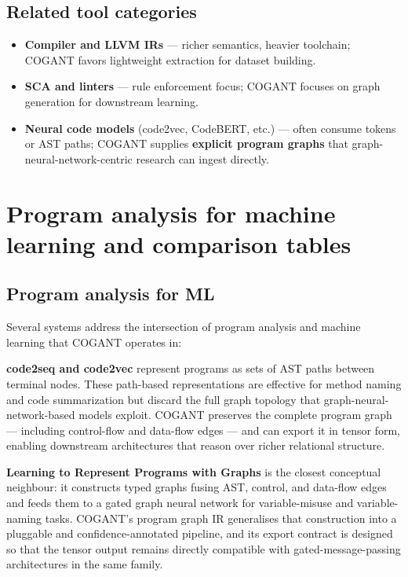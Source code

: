\documentclass[
]{article}
\providecommand{\tightlist}{%
  \setlength{\itemsep}{0pt}\setlength{\parskip}{0pt}}
\begin{document}
\subsection{Related tool categories}\label{related-tool-categories}

\begin{itemize}
\tightlist
\item
  \textbf{Compiler and LLVM IRs} --- richer semantics, heavier
  toolchain; COGANT favors lightweight extraction for dataset building.
\item
  \textbf{SCA and linters} --- rule enforcement focus; COGANT focuses on
  graph generation for downstream learning.
\item
  \textbf{Neural code models} (code2vec, CodeBERT, etc.) --- often
  consume tokens or AST paths; COGANT supplies \textbf{explicit program
  graphs} that graph-neural-network-centric research can ingest
  directly.
\end{itemize}

\newpage

\section{Program analysis for machine learning and comparison
tables}\label{program-analysis-for-machine-learning-and-comparison-tables}

\subsection{Program analysis for ML}\label{program-analysis-for-ml}

Several systems address the intersection of program analysis and machine
learning that COGANT operates in:

\textbf{code2seq and code2vec} \citep{alon2019code2vec} represent
programs as sets of AST paths between terminal nodes. These path-based
representations are effective for method naming and code summarization
but discard the full graph topology that graph-neural-network-based
models exploit. COGANT preserves the complete program graph ---
including control-flow and data-flow edges --- and can export it in
tensor form, enabling downstream architectures that reason over richer
relational structure.

\textbf{Learning to Represent Programs with Graphs}
\citep{allamanis2018learning} is the closest conceptual neighbour: it
constructs typed graphs fusing AST, control, and data-flow edges and
feeds them to a gated graph neural network for variable-misuse and
variable-naming tasks. COGANT's program graph IR generalises that
construction into a pluggable and confidence-annotated pipeline, and its
export contract is designed so that the tensor output remains directly
compatible with gated-message-passing architectures in the same family.
\end{document}
